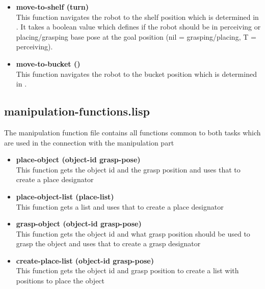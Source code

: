 \documentclass[main.tex]{subfiles}
\begin{document}
\begin{itemize}
	    \item \textbf{move-to-shelf (turn)} \\
	    This function navigates the robot to the shelf position which is determined in . It takes a boolean value which defines if the robot should be in perceiving or placing/grasping base pose at the goal position (nil = grasping/placing, T = perceiving).
	    \item \textbf{move-to-bucket ()} \\
	    This function navigates the robot to the bucket position which is determined in .  
		\end{itemize}
	    \subsection{manipulation-functions.lisp}
	    \label{manipulation}
	    The manipulation function file contains all functions common to both tasks which are used in the connection with the manipulation part
	    \begin{itemize}
	    \item \textbf{place-object (object-id grasp-pose)} \\
	    This function gets the object id and the grasp position and uses that to create a place designator  
		\item \textbf{place-object-list (place-list)} \\
		This function gets a list and uses that to create a place designator 
	    \item \textbf{grasp-object (object-id grasp-pose)} \\
	    This function gets the object id and what grasp position should be used to grasp the object and uses that to create a grasp designator
	    \item \textbf{create-place-list (object-id grasp-pose)} \\
	    This function gets the object id and grasp position to create a list with positions to place the object
		\end{itemize}
\end{document}
